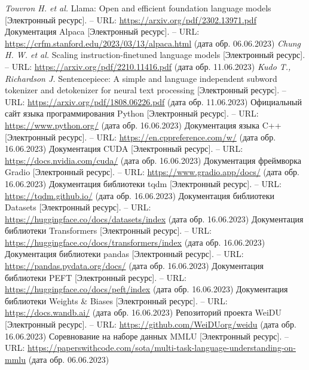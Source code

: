 \begin{thebibliography}{99}
  \textit{Touvron H. et al.} Llama: Open and efficient foundation language models [Электронный ресурс]. -- URL: \url{https://arxiv.org/pdf/2302.13971.pdf}
  Документация Alpaca [Электронный ресурс]. -- URL: \url{https://crfm.stanford.edu/2023/03/13/alpaca.html} (дата обр. 06.06.2023)
  \textit{Chung H. W. et al.} Scaling instruction-finetuned language models [Электронный ресурс]. -- URL: \url{https://arxiv.org/pdf/2210.11416.pdf} (дата обр. 11.06.2023)
  \textit{Kudo T., Richardson J.} Sentencepiece: A simple and language independent subword tokenizer and detokenizer for neural text processing [Электронный ресурс]. -- URL: \url{https://arxiv.org/pdf/1808.06226.pdf} (дата обр. 11.06.2023)
  Официальный сайт языка программирования Python [Электронный ресурс]. -- URL: \url{https://www.python.org/} (дата обр. 16.06.2023)
  Документация языка C++ [Электронный ресурс]. -- URL: \url{https://en.cppreference.com/w/} (дата обр. 16.06.2023)
  Документация CUDA [Электронный ресурс]. -- URL: \url{https://docs.nvidia.com/cuda/} (дата обр. 16.06.2023)
  Документация фреймворка Gradio [Электронный ресурс]. -- URL: \url{https://www.gradio.app/docs/} (дата обр. 16.06.2023)
  Документация библиотеки tqdm [Электронный ресурс]. -- URL: \url{https://tqdm.github.io/} (дата обр. 16.06.2023)
  Документация библиотеки Datasets [Электронный ресурс]. -- URL: \url{https://huggingface.co/docs/datasets/index} (дата обр. 16.06.2023)
  Документация библиотеки Transformers [Электронный ресурс]. -- URL: \url{https://huggingface.co/docs/transformers/index} (дата обр. 16.06.2023)
  Документация библиотеки pandas [Электронный ресурс]. -- URL: \url{https://pandas.pydata.org/docs/} (дата обр. 16.06.2023)
  Документация библиотеки PEFT [Электронный ресурс]. -- URL: \url{https://huggingface.co/docs/peft/index} (дата обр. 16.06.2023)
  Документация библиотеки Weights \& Biases [Электронный ресурс]. -- URL: \url{https://docs.wandb.ai/} (дата обр. 16.06.2023)
  Репозиторий проекта WeiDU [Электронный ресурс]. -- URL: \url{https://github.com/WeiDUorg/weidu} (дата обр. 16.06.2023)
  Соревнование на наборе данных MMLU [Электронный ресурс]. -- URL: \url{https://paperswithcode.com/sota/multi-task-language-understanding-on-mmlu} (дата обр. 06.06.2023)

\end{thebibliography}
